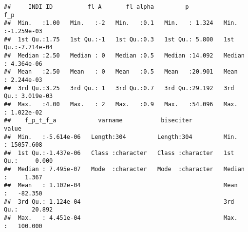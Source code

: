 \documentclass[
]{book}
\newenvironment{Shaded}{\begin{snugshade}}{\end{snugshade}}
\newcommand{\CommentTok}[1]{\textcolor[rgb]{0.56,0.35,0.01}{\textit{#1}}}
\newcommand{\DataTypeTok}[1]{\textcolor[rgb]{0.13,0.29,0.53}{#1}}
\newcommand{\KeywordTok}[1]{\textcolor[rgb]{0.13,0.29,0.53}{\textbf{#1}}}
\newcommand{\NormalTok}[1]{#1}
\newcommand{\OperatorTok}[1]{\textcolor[rgb]{0.81,0.36,0.00}{\textbf{#1}}}
\newcommand{\StringTok}[1]{\textcolor[rgb]{0.31,0.60,0.02}{#1}}
\begin{document}
\begin{Shaded}
\end{Shaded}

\begin{verbatim}
##     INDI_ID          fl_A       fl_alpha         p               f_p            
##  Min.   :1.00   Min.   :-2   Min.   :0.1   Min.   : 1.324   Min.   :-1.259e-03  
##  1st Qu.:1.75   1st Qu.:-1   1st Qu.:0.3   1st Qu.: 5.800   1st Qu.:-7.714e-04  
##  Median :2.50   Median : 0   Median :0.5   Median :14.092   Median : 4.364e-06  
##  Mean   :2.50   Mean   : 0   Mean   :0.5   Mean   :20.901   Mean   : 2.244e-03  
##  3rd Qu.:3.25   3rd Qu.: 1   3rd Qu.:0.7   3rd Qu.:29.192   3rd Qu.: 3.019e-03  
##  Max.   :4.00   Max.   : 2   Max.   :0.9   Max.   :54.096   Max.   : 1.022e-02  
##    f_p_t_f_a            varname           biseciter             value           
##  Min.   :-5.614e-06   Length:304         Length:304         Min.   :-15057.608  
##  1st Qu.:-1.437e-06   Class :character   Class :character   1st Qu.:     0.000  
##  Median : 7.495e-07   Mode  :character   Mode  :character   Median :     1.367  
##  Mean   : 1.102e-04                                         Mean   :   -82.350  
##  3rd Qu.: 1.124e-04                                         3rd Qu.:    20.892  
##  Max.   : 4.451e-04                                         Max.   :   100.000
\end{verbatim}
\end{document}
